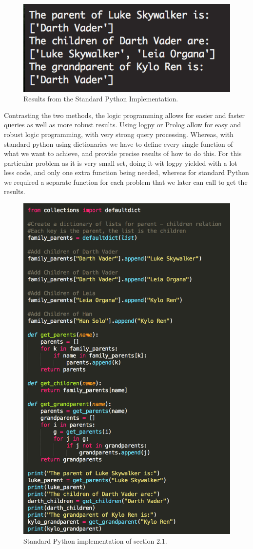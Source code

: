 \documentclass[12pt, letter]{article}
\begin{document}
 \begin{figure}[htb]
  \centering
  \includegraphics[width=0.55 \textwidth]{./figures/standard_result.png}
  \caption{Results from the Standard Python Implementation.}
\end{figure}

Contrasting the two methods, the logic programming allows for easier and faster queries as well as more robust results. Using logpy or Prolog allow for easy and robust logic programming, with very strong query processing. Whereas, with standard python using dictionaries we have to define every single function of what we want to achieve, and provide precise results of how to do this.  For this particular problem as it is very small set, doing it wit logpy yielded with a lot less code, and only one extra function being needed, whereas for standard Python we required a separate function for each problem that we later can call to get the results. 

 \begin{figure}[htb]
  \centering
  \includegraphics[width=0.80 \textwidth]{./figures/standard_py.png}
  \caption{Standard Python implementation of section 2.1.}
\end{figure}
\end{document}
